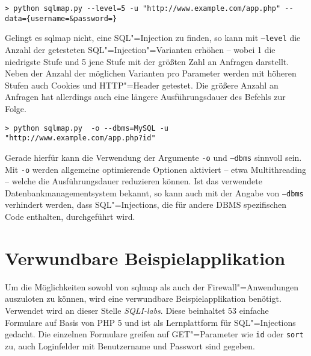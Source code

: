 \begin{listing}[ht!]
\begin{verbatim}
> python sqlmap.py --level=5 -u "http://www.example.com/app.php" --data={username=&password=}
\end{verbatim}
\end{listing}

Gelingt es sqlmap nicht, eine SQL"=Injection zu finden, so kann mit \texttt{--level} die Anzahl der getesteten SQL"=Injection"=Varianten erhöhen -- wobei 1 die niedrigste Stufe und 5 jene Stufe mit der größten Zahl an Anfragen darstellt. Neben der Anzahl der möglichen Varianten pro Parameter werden mit höheren Stufen auch Cookies und HTTP"=Header getestet. Die größere Anzahl an Anfragen hat allerdings auch eine längere Ausführungsdauer des Befehls zur Folge.

\begin{listing}[ht!]
\begin{verbatim}
> python sqlmap.py  -o --dbms=MySQL -u "http://www.example.com/app.php?id"
\end{verbatim}
\end{listing}

Gerade hierfür kann die Verwendung der Argumente \texttt{-o} und \texttt{--dbms} sinnvoll sein. Mit \texttt{-o} werden allgemeine optimierende Optionen aktiviert -- etwa Multithreading -- welche die Ausführungsdauer reduzieren können. Ist das verwendete Datenbankmanagementsystem bekannt, so kann auch mit der Angabe von \texttt{--dbms} verhindert werden, dass SQL"=Injections, die für andere DBMS spezifischen Code enthalten, durchgeführt wird.


\section{Verwundbare Beispielapplikation}

Um die Möglichkeiten sowohl von sqlmap als auch der Firewall"=Anwendungen auszuloten zu können, wird eine verwundbare Beispielapplikation benötigt. Verwendet wird an dieser Stelle \emph{SQLI-labs}. Diese beinhaltet 53 einfache Formulare auf Basis von PHP 5 und ist als Lernplattform für SQL"=Injections gedacht. Die einzelnen Formulare greifen auf GET"=Parameter wie \texttt{id} oder \texttt{sort} zu, auch Loginfelder mit Benutzername und Passwort sind gegeben.

